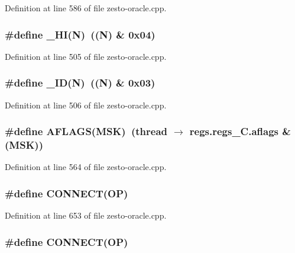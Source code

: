 Definition at line 586 of file zesto-oracle.cpp.
\subsubsection[{\_\-HI}]{\setlength{\rightskip}{0pt plus 5cm}\#define \_\-HI(N)~((N) \& 0x04)}\label{zesto-oracle_8cpp_950ef2d9ae345ed861765730157d37d2}




Definition at line 505 of file zesto-oracle.cpp.
\subsubsection[{\_\-ID}]{\setlength{\rightskip}{0pt plus 5cm}\#define \_\-ID(N)~((N) \& 0x03)}\label{zesto-oracle_8cpp_711eed827b7f6cfec827e05579cd2b66}




Definition at line 506 of file zesto-oracle.cpp.
\subsubsection[{AFLAGS}]{\setlength{\rightskip}{0pt plus 5cm}\#define AFLAGS(MSK)~(thread $\rightarrow$ regs.regs\_\-C.aflags \& (MSK))}\label{zesto-oracle_8cpp_369389eba049ae8bd5b4de5d660b861f}




Definition at line 564 of file zesto-oracle.cpp.
\subsubsection[{CONNECT}]{\setlength{\rightskip}{0pt plus 5cm}\#define CONNECT(OP)}\label{zesto-oracle_8cpp_39a7648865000d8fa2ae64257cb18132}




Definition at line 653 of file zesto-oracle.cpp.
\subsubsection[{CONNECT}]{\setlength{\rightskip}{0pt plus 5cm}\#define CONNECT(OP)}\label{zesto-oracle_8cpp_39a7648865000d8fa2ae64257cb18132}





